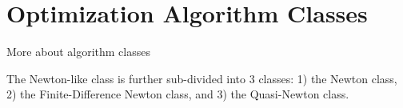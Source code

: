 \section{Optimization Algorithm Classes}

More about algorithm classes

The Newton-like class is further sub-divided into 3 classes: 1) the
Newton class, 2) the Finite-Difference Newton class, and 3) the
Quasi-Newton class.


